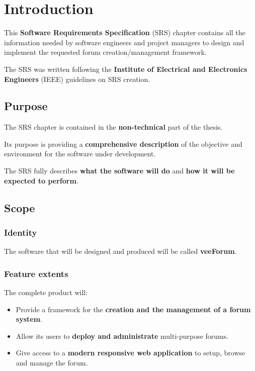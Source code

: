 \documentclass[12pt]{report}
\renewcommand\emph{\textbf}
\begin{document}
            \section{Introduction}
                This \emph{Software Requirements Specification} (SRS) chapter contains all the information needed by software engineers and project managers to design and implement the requested forum creation/management framework.

                The SRS was written following the \emph{Institute of Electrical and Electronics Engineers} (IEEE) guidelines on SRS creation.

                \subsection{Purpose}
                    The SRS chapter is contained in the \emph{non-technical} part of the thesis.

                    Its purpose is providing a \emph{comprehensive description} of the objective and environment for the software under development.

                    The SRS fully describes \emph{what the software will do} and \emph{how it will be expected to perform}.

                \subsection{Scope}

                    \subsubsection{Identity}
                        The software that will be designed and produced will be called \emph{veeForum}.

                    \subsubsection{Feature extents}

                        The complete product will:

                        \begin{itemize}
                            \item Provide a framework for the \emph{creation and the management of a forum system}.
                            \item Allow its users to \emph{deploy and administrate} multi-purpose forums.
                            \item Give access to a \emph{modern responsive web application} to setup, browse and manage the forum.
                        \end{itemize}
\end{document}
